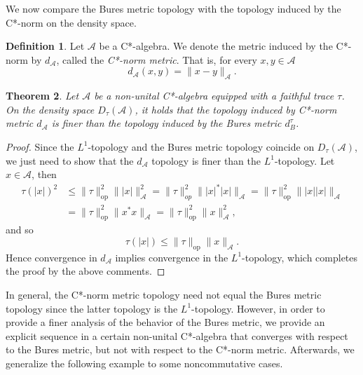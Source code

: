 \documentclass{amsart}
\theoremstyle{plain}
\newtheorem{theorem}{Theorem}[section]
\theoremstyle{definition}
\newtheorem{definition}[theorem]{Definition}
\theoremstyle{remark}
\numberwithin{equation}{section}
\newcommand{\A}{{\mathcal{A}}}
\renewcommand{\leq}{\leqslant}
\begin{document}
We now compare the Bures metric topology with the topology induced by the C*-norm on the density space.

\begin{definition}\label{d:c*-norm}
    Let $\A$ be a C*-algebra. We denote the metric induced by the C*-norm by $d_\A$, called the {\em C*-norm metric}. That is, for every $x,y\in \A$
    \[
    d_\A(x,y)=\|x-y\|_\A.
    \]
\end{definition}

\begin{theorem}\label{t:c*-norm-bures}
    Let $\A$ be a non-unital C*-algebra equipped with a faithful trace $\tau$. On the density space $D_\tau(\A)$, it holds that the topology induced by C*-norm metric $d_\A$ is finer than the  topology induced by the Bures metric $d_B^\tau$.
\end{theorem}
\begin{proof}
Since the $L^1$-topology and the Bures metric topology coincide on $D_\tau(\A)$, we just need to show that the $d_\A$ topology is finer than the $L^1$-topology. Let  $x\in \A$, then
\begin{align*}
\tau(|x|)^2 & \leq \|\tau\|_\mathrm{op}^2 \||x|\|_\A^2=\|\tau\|_{op}^2 \||x|^*|x|\|_\A=\|\tau\|_\mathrm{op}^2 \||x||x|\|_\A\\
&=\|\tau\|_\mathrm{op}^2 \|x^*x\|_\A=\|\tau\|_\mathrm{op}^2 \|x\|^2_\A,
\end{align*}
and so
\[
\tau(|x|)\leq \|\tau\|_\mathrm{op} \|x\|_\A.
\]
Hence convergence in $d_\A$ implies convergence in the $L^1$-topology, which completes the proof by the above comments.
\end{proof}

In general, the C*-norm metric topology need not equal the Bures metric topology since the latter topology is the $L^1$-topology. However, in order to provide a finer analysis of the behavior of the Bures metric, we provide an explicit sequence in a certain non-unital C*-algebra that converges with respect to the Bures metric, but not with respect to the C*-norm metric. Afterwards, we generalize the following example to some noncommutative cases.
\end{document}
